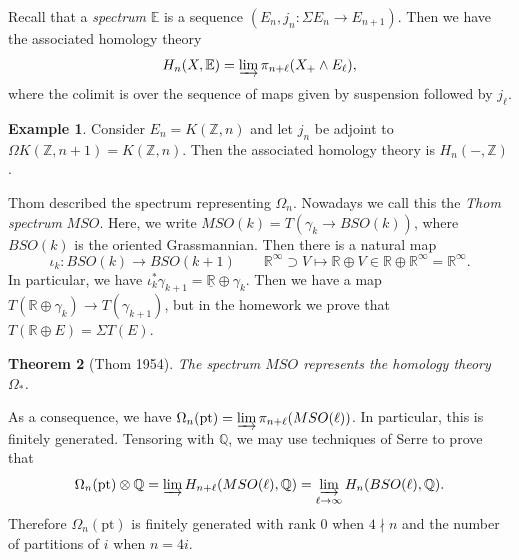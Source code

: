 \documentclass[leqno, openany]{memoir}
\newtheorem{thm}{Theorem}[section]
\theoremstyle{definition}
\newtheorem{exm}[thm]{Example}
\theoremstyle{remark}
\theoremstyle{plain}
\theoremstyle{definition}
\theoremstyle{remark}
\newcommand{\R}{\mathbb{R}}
\newcommand{\Z}{\mathbb{Z}}
\newcommand{\Q}{\mathbb{Q}}
\newcommand{\mr}[1]{\mathrm{#1}}
\begin{document}
Recall that a \textit{spectrum} $\mathbb{E}$ is a sequence $(E_n, j_n \colon
\Sigma E_n \to E_{n+1})$. Then we have the associated homology theory \[ H_n(X,
\mathbb{E}) = \varinjlim \pi_{n+\ell} (X_+ \wedge E_{\ell}), \] where the
colimit is over the sequence of maps given by suspension followed by
$j_{\ell}$.

\begin{exm} Consider $E_n = K(\Z, n)$ and let $j_n$ be adjoint to $\Omega K(\Z,
n+1) = K(\Z, n)$. Then the associated homology theory is $H_n(-, \Z)$.
\end{exm}

Thom described the spectrum representing $\Omega_n$. Nowadays we call this the
\textit{Thom spectrum} $MSO$. Here, we write $MSO(k) = T(\gamma_k \to BSO(k))$,
where $BSO(k)$ is the oriented Grassmannian. Then there is a natural map \[
\iota_k \colon BSO(k) \to BSO(k+1) \qquad \R^{\infty} \supset V \mapsto \R
\oplus V \in \R \oplus \R^{\infty} = \R^{\infty}. \] In particular, we have
$\iota_k^* \gamma_{k+1} = \underline{\R} \oplus \gamma_k$. Then we have a map
$T(\R \oplus \gamma_k) \to T(\gamma_{k+1})$, but in the homework we prove that
$T(\R \oplus E) = \Sigma T(E)$.

\begin{thm}[Thom 1954] The spectrum $MSO$ represents the homology theory
$\Omega_*$.  \end{thm}

As a consequence, we have $\Omega_n(\mr{pt}) = \varinjlim
\pi_{n+\ell}(MSO(\ell))$. In particular, this is finitely generated. Tensoring
with $\Q$, we may use techniques of Serre to prove that \[ \Omega_n(\mr{pt})
\otimes \Q = \varinjlim H_{n+\ell} (MSO(\ell), \Q) = \varinjlim_{\ell \to
\infty} H_n(BSO(\ell), \Q). \] Therefore $\Omega_n(\mr{pt})$ is finitely
generated with rank $0$ when $4 \nmid n$ and the number of partitions of $i$
when $n = 4i$.
\end{document}
